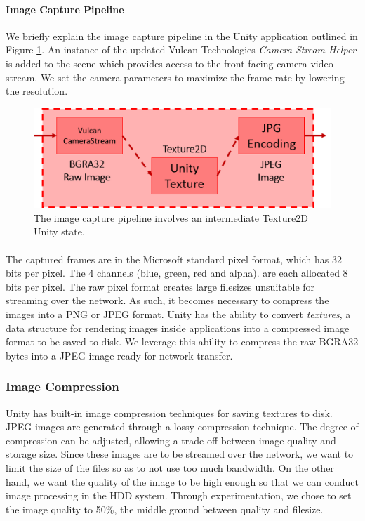 \paragraph{Image Capture Pipeline} We briefly explain the image capture pipeline in the Unity application outlined in Figure \ref{fig:imgProcPipeline}. An instance of the updated Vulcan Technologies \textit{Camera Stream Helper} is added to the scene which provides access to the front facing camera video stream. We set the camera parameters to maximize the frame-rate by lowering the resolution. 

\begin{figure}[ht]
	\centering
	\includegraphics[width=0.6\linewidth]{img/chapter5_implementation/imageCapturePipeline.png}
	\caption{The image capture pipeline involves an intermediate Texture2D Unity state.}
	\label{fig:imgProcPipeline}
\end{figure}

\paragraph{} The captured frames are in the Microsoft standard  pixel format, which has 32 bits per pixel. The 4 channels (blue, green, red and alpha). are each allocated 8 bits per pixel. The raw pixel format creates large filesizes unsuitable for streaming over the network. As such, it becomes necessary to compress the images into a PNG or JPEG format. Unity has the ability to convert \textit{textures}, a data structure for rendering images inside applications into a compressed image format to be saved to disk. We leverage this ability to compress the raw BGRA32 bytes into a JPEG image ready for network transfer.

\subsubsection{Image Compression}
Unity has built-in image compression techniques for saving textures to disk. JPEG images are generated through a lossy compression technique. The degree of compression can be adjusted, allowing a trade-off between image quality and storage size. Since these images are to be streamed over the network, we want to limit the size of the files so as to not use too much bandwidth. On the other hand, we want the quality of the image to be high enough so that we can conduct image processing in the HDD system. Through experimentation, we chose to set the image quality to 50\%, the middle ground between quality and filesize.

